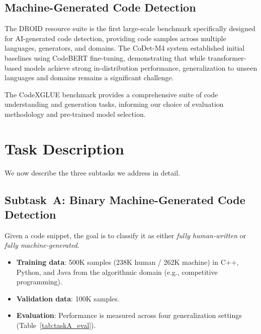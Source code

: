 \documentclass[11pt]{article}
\begin{document}
\subsection{Machine-Generated Code Detection}

The DROID resource suite \cite{orel2025droid} is the first large-scale benchmark specifically designed for AI-generated code detection, providing code samples across multiple languages, generators, and domains. The CoDet-M4 system \cite{orel-etal-2025-codet} established initial baselines using CodeBERT fine-tuning, demonstrating that while transformer-based models achieve strong in-distribution performance, generalization to unseen languages and domains remains a significant challenge.

The CodeXGLUE benchmark \cite{lu2021codexglue} provides a comprehensive suite of code understanding and generation tasks, informing our choice of evaluation methodology and pre-trained model selection.

\section{Task Description}
\label{sec:task}

We now describe the three subtasks we address in detail.

\subsection{Subtask~A: Binary Machine-Generated Code Detection}

Given a code snippet, the goal is to classify it as either \textit{fully human-written} or \textit{fully machine-generated}.

\begin{itemize}
    \item \textbf{Training data}: 500K samples (238K human / 262K machine) in C++, Python, and Java from the algorithmic domain (e.g., competitive programming).
    \item \textbf{Validation data}: 100K samples.
    \item \textbf{Evaluation}: Performance is measured across four generalization settings (Table~\ref{tab:taskA_eval}).
\end{itemize}
\end{document}

